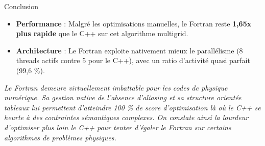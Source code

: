 \begin{frame}{Conclusion}
    \begin{itemize}
        \fontsize{9}{10}\selectfont
        \item \textbf{Performance} : Malgré les optimisations manuelles, le Fortran reste \textbf{1,65x plus rapide} que le C++ sur cet algorithme multigrid.
        \item \textbf{Architecture} : Le Fortran exploite nativement mieux le parallélisme (8 threads actifs contre 5 pour le C++), avec un ratio d'activité quasi parfait (99,6 \%).
    \end{itemize}
    
    \begin{block}{}
        \centering \fontsize{12}{14}\selectfont
        \textit{Le Fortran demeure virtuellement imbattable pour les codes de physique numérique. Sa gestion native de l'absence d'aliasing et sa structure orientée tableaux lui permettent d'atteindre 100 \% de score d'optimisation là où le C++ se heurte à des contraintes sémantiques complexes.
        On constate ainsi la lourdeur d'optimiser plus loin le C++ pour tenter d'égaler le Fortran sur certains algorithmes de problèmes physiques.}
    \end{block}
\end{frame}

